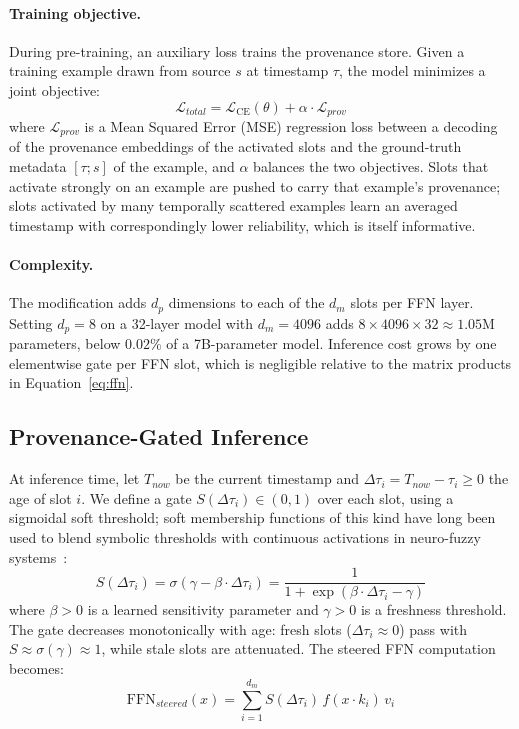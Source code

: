 \documentclass{article}
\begin{document}
\paragraph{Training objective.} During pre-training, an auxiliary loss trains the provenance store. Given a training example drawn from source $s$ at timestamp $\tau$, the model minimizes a joint objective:
\begin{equation}
  \mathcal{L}_{total} = \mathcal{L}_{\text{CE}}(\theta) + \alpha \cdot \mathcal{L}_{prov}
\end{equation}
where $\mathcal{L}_{prov}$ is a Mean Squared Error (MSE) regression loss between a decoding of the provenance embeddings of the activated slots and the ground-truth metadata $[\tau; s]$ of the example, and $\alpha$ balances the two objectives. Slots that activate strongly on an example are pushed to carry that example's provenance; slots activated by many temporally scattered examples learn an averaged timestamp with correspondingly lower reliability, which is itself informative.

\paragraph{Complexity.} The modification adds $d_p$ dimensions to each of the $d_m$ slots per FFN layer. Setting $d_p = 8$ on a 32-layer model with $d_m = 4096$ adds $8 \times 4096 \times 32 \approx 1.05$M parameters, below $0.02\%$ of a 7B-parameter model. Inference cost grows by one elementwise gate per FFN slot, which is negligible relative to the matrix products in Equation~\ref{eq:ffn}.

\subsection{Provenance-Gated Inference}
\label{sec:gating}

At inference time, let $T_{now}$ be the current timestamp and $\Delta\tau_i = T_{now} - \tau_i \geq 0$ the age of slot $i$. We define a gate $S(\Delta\tau_i) \in (0, 1)$ over each slot, using a sigmoidal soft threshold; soft membership functions of this kind have long been used to blend symbolic thresholds with continuous activations in neuro-fuzzy systems~\citep{thakur2021neurofuzzy}:
\begin{equation}
  \label{eq:gate}
  S(\Delta\tau_i) = \sigma\!\left( \gamma - \beta \cdot \Delta\tau_i \right)
  = \frac{1}{1 + \exp\!\left(\beta \cdot \Delta\tau_i - \gamma\right)}
\end{equation}
where $\beta > 0$ is a learned sensitivity parameter and $\gamma > 0$ is a freshness threshold. The gate decreases monotonically with age: fresh slots ($\Delta\tau_i \approx 0$) pass with $S \approx \sigma(\gamma) \approx 1$, while stale slots are attenuated. The steered FFN computation becomes:
\begin{equation}
  \label{eq:steering}
  \text{FFN}_{steered}(x) = \sum_{i=1}^{d_m} S(\Delta\tau_i)\, f(x \cdot k_i)\, v_i
\end{equation}
\end{document}
